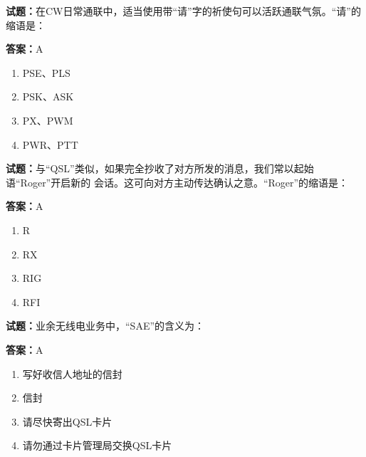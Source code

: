 \documentclass{ctexbook}
\begin{document}




\vspace{1em}

\textbf{试题：}在CW日常通联中，适当使用带“请”字的祈使句可以活跃通联气氛。“请”的缩语是： 


\textbf{答案：}A 

\begin{enumerate}[leftmargin=3em]
  \item PSE、PLS 

  \item PSK、ASK 

  \item PX、PWM 

  \item PWR、PTT 

\end{enumerate}





\vspace{1em}

\textbf{试题：}与“QSL”类似，如果完全抄收了对方所发的消息，我们常以起始语“Roger”开启新的
会话。这可向对方主动传达确认之意。“Roger”的缩语是： 

\textbf{答案：}A 

\begin{enumerate}[leftmargin=3em]
  \item R 

  \item RX 

  \item RIG 

  \item RFI 

\end{enumerate}





\vspace{1em}

\textbf{试题：}业余无线电业务中，“SAE”的含义为： 

\textbf{答案：}A 

\begin{enumerate}[leftmargin=3em]
  \item 写好收信人地址的信封 

  \item 信封 

  \item 请尽快寄出QSL卡片 

  \item 请勿通过卡片管理局交换QSL卡片 

\end{enumerate}
\end{document}
